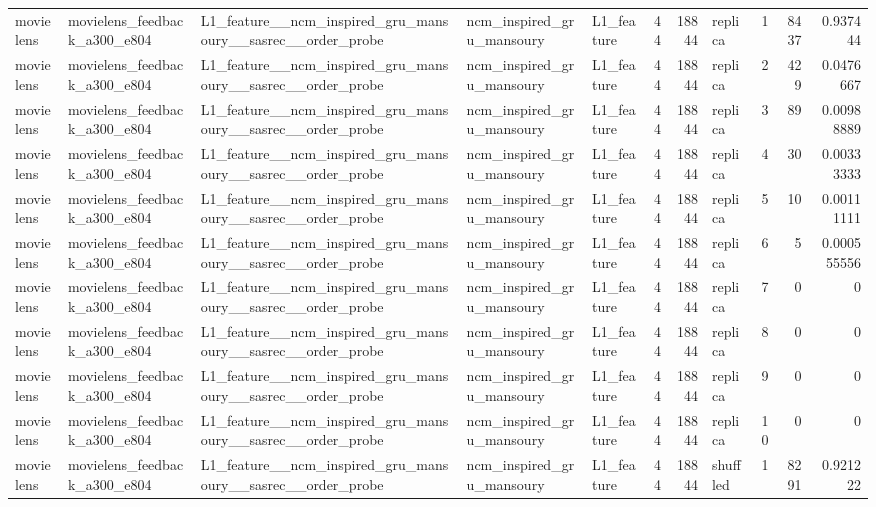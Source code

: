 \begin{table}[htbp!]
\begin{tabular}{lllllrrlrrr}
movielens & movielens\_feedback\_a300\_e804 & L1\_feature\_\_ncm\_inspired\_gru\_mansoury\_\_sasrec\_\_order\_probe & ncm\_inspired\_gru\_mansoury & L1\_feature & 44 & 18844 & replica & 1 & 8437 & 0.937444 \\
movielens & movielens\_feedback\_a300\_e804 & L1\_feature\_\_ncm\_inspired\_gru\_mansoury\_\_sasrec\_\_order\_probe & ncm\_inspired\_gru\_mansoury & L1\_feature & 44 & 18844 & replica & 2 & 429 & 0.0476667 \\
movielens & movielens\_feedback\_a300\_e804 & L1\_feature\_\_ncm\_inspired\_gru\_mansoury\_\_sasrec\_\_order\_probe & ncm\_inspired\_gru\_mansoury & L1\_feature & 44 & 18844 & replica & 3 & 89 & 0.00988889 \\
movielens & movielens\_feedback\_a300\_e804 & L1\_feature\_\_ncm\_inspired\_gru\_mansoury\_\_sasrec\_\_order\_probe & ncm\_inspired\_gru\_mansoury & L1\_feature & 44 & 18844 & replica & 4 & 30 & 0.00333333 \\
movielens & movielens\_feedback\_a300\_e804 & L1\_feature\_\_ncm\_inspired\_gru\_mansoury\_\_sasrec\_\_order\_probe & ncm\_inspired\_gru\_mansoury & L1\_feature & 44 & 18844 & replica & 5 & 10 & 0.00111111 \\
movielens & movielens\_feedback\_a300\_e804 & L1\_feature\_\_ncm\_inspired\_gru\_mansoury\_\_sasrec\_\_order\_probe & ncm\_inspired\_gru\_mansoury & L1\_feature & 44 & 18844 & replica & 6 & 5 & 0.000555556 \\
movielens & movielens\_feedback\_a300\_e804 & L1\_feature\_\_ncm\_inspired\_gru\_mansoury\_\_sasrec\_\_order\_probe & ncm\_inspired\_gru\_mansoury & L1\_feature & 44 & 18844 & replica & 7 & 0 & 0 \\
movielens & movielens\_feedback\_a300\_e804 & L1\_feature\_\_ncm\_inspired\_gru\_mansoury\_\_sasrec\_\_order\_probe & ncm\_inspired\_gru\_mansoury & L1\_feature & 44 & 18844 & replica & 8 & 0 & 0 \\
movielens & movielens\_feedback\_a300\_e804 & L1\_feature\_\_ncm\_inspired\_gru\_mansoury\_\_sasrec\_\_order\_probe & ncm\_inspired\_gru\_mansoury & L1\_feature & 44 & 18844 & replica & 9 & 0 & 0 \\
movielens & movielens\_feedback\_a300\_e804 & L1\_feature\_\_ncm\_inspired\_gru\_mansoury\_\_sasrec\_\_order\_probe & ncm\_inspired\_gru\_mansoury & L1\_feature & 44 & 18844 & replica & 10 & 0 & 0 \\
movielens & movielens\_feedback\_a300\_e804 & L1\_feature\_\_ncm\_inspired\_gru\_mansoury\_\_sasrec\_\_order\_probe & ncm\_inspired\_gru\_mansoury & L1\_feature & 44 & 18844 & shuffled & 1 & 8291 & 0.921222 \\

\end{tabular}
\end{table}
